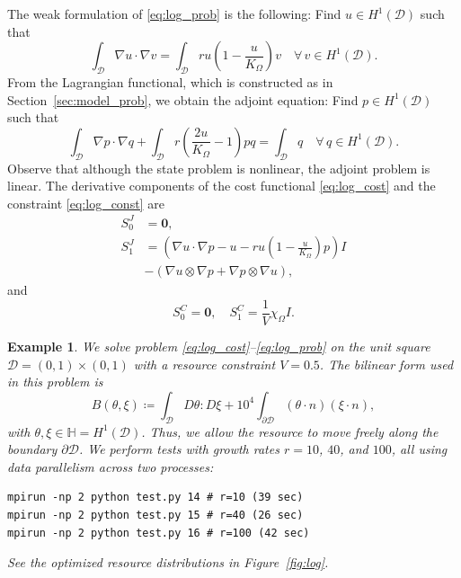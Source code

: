 \documentclass[iicol,pdflatex,sn-mathphys-ay]{sn-jnl}%
\theoremstyle{thmstyleone}%
\theoremstyle{thmstyletwo}%
\newtheorem{example}{Example}%
\theoremstyle{thmstylethree}%
\begin{document}
The weak formulation of \eqref{eq:log_prob} is the following:
Find $u\in H^1(\mathcal{D})$ such that
\begin{equation}\label{eq:log_weak}
	\int_{\mathcal{D}}\nabla u \cdot \nabla v =
	\int_{\mathcal{D}}ru\left(1-\frac{u}{K_{\Omega}}\right)v
	\quad
	\forall \, v \in  H^1(\mathcal{D}).
\end{equation}
From the Lagrangian functional, which is constructed as in
Section~\ref{sec:model_prob}, we obtain the adjoint equation:
Find $p\in H^1(\mathcal{D})$ such that
\[
	\int_{\mathcal{D}}\nabla p \cdot \nabla q +
	\int_{\mathcal{D}}r\left(\frac{2u}{K_{\Omega}}-1\right)pq = 
	\int_{\mathcal{D}}q
	\quad
	\forall \, q \in H^1(\mathcal{D}).
\]
Observe that although the state problem is nonlinear,
the adjoint problem is linear.
The derivative components of the cost functional \eqref{eq:log_cost} and
the constraint \eqref{eq:log_const} are
\[
\begin{aligned}
	S^J_0 &= \boldsymbol{0},\\
	S^J_1 &= \left(
				\nabla u\cdot\nabla p-u-ru\left(1-\frac{u}{K_{\Omega}}\right)p
			\right)I \\
		&-(\nabla u\otimes\nabla p+\nabla p\otimes\nabla u),
\end{aligned}
\]
and
\[
	S_0^C =\boldsymbol{0},
	\quad
	S_1^C =\frac{1}{V}\chi_{\Omega}I.
\]

\begin{example}\label{ex:log}
We solve problem \eqref{eq:log_cost}--\eqref{eq:log_prob}
on the unit square $\mathcal{D} = (0,1)\times(0,1)$
with a resource constraint $V=0.5$. The bilinear form used in this problem is
\[
	B(\theta, \xi) \coloneqq
	\int_{\mathcal{D}} D\theta \colon\! D\xi +
	{10}^4 \int_{\partial \mathcal{D}}(\theta \cdot n) (\xi \cdot n),	
\]
with $\theta,\xi\in\mathbb{H}=H^1(\mathcal{D})$.
Thus, we allow the resource to move freely along
the boundary $\partial\mathcal{D}$.
We perform tests with growth rates $r = 10$, $40$, and $100$,
all using data parallelism across two processes:
\begin{lstlisting}
mpirun -np 2 python test.py 14 # r=10 (39 sec)
mpirun -np 2 python test.py 15 # r=40 (26 sec)
mpirun -np 2 python test.py 16 # r=100 (42 sec)
\end{lstlisting}
See the optimized resource distributions in Figure~\ref{fig:log}.
\end{example}
\end{document}
